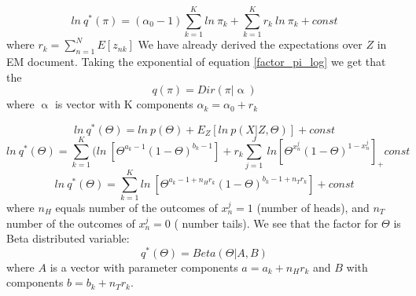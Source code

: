\documentclass{article}
\newcommand\SumK{\sum_{k=1}^{K}}
\newcommand\SumN{\sum_{n=1}^{N}}
\newcommand\SumJ{\sum_{j=1}^{J}}
\begin{document}
\begin{equation}\label{factor_pi_log}
    ln\:q^*(\pi) = (\alpha_0-1)\SumK{ln\:\pi_k} + \SumK r_k\:ln\:\pi_k+ const
\end{equation}
where $r_{k} = \SumN E[z_{nk}]$
We have already derived the expectations over $Z$ in EM document.
Taking the exponential of equation \ref{factor_pi_log} we get that the 
\begin{equation}
    q(\pi) = Dir(\pi| \upalpha)
\end{equation}
where $\upalpha$ is vector with K components $\alpha_k = \alpha_0+r_k$

\begin{equation}
    ln\:q^*(\Theta) = ln\:p(\Theta) + E_Z[ln\:p(X|Z,\Theta)] + const
\end{equation}
\begin{equation}
    ln\:q^*(\Theta) = \SumK (ln\:[\Theta^{a_k-1}(1-\Theta)^{b_k-1}] + r_{k}\SumJ \:ln[\Theta^{x_n^j}(1-\Theta)^{1-x_n^j}]_ + const
\end{equation}
\begin{equation}
    ln\:q^*(\Theta) = \SumK ln\:[\Theta^{a_k-1+n_H{r_k}}(1-\Theta)^{b_k-1+n_T{r_k}}] + const
\end{equation}
where $n_H$ equals number of the outcomes of $x_n^j = 1$ (number of heads), and $n_T$ number of the outcomes of $x_n^j = 0$ ( number tails).
We see that the factor for $\Theta$ is Beta distributed variable:
\begin{equation}
    q^*(\Theta) = Beta(\Theta|A, B)
\end{equation}
where $A$ is a vector with parameter components $a = a_{k}+n_H{r_k}$ and $B$ with components $b = b_{k}+n_T{r_k}$.
\end{document}
